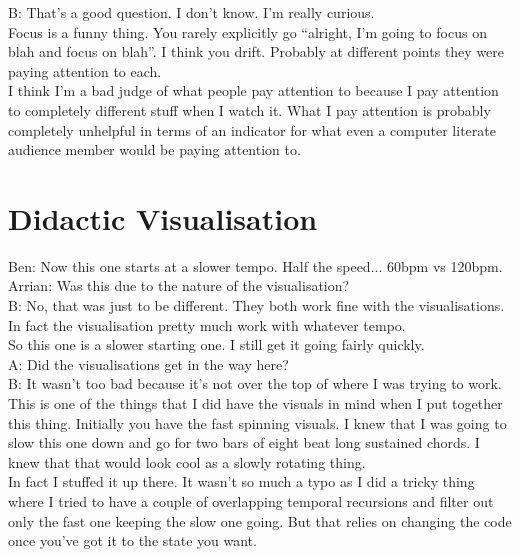 B: That's a good question. I don't know. I'm really curious.\\

Focus is a funny thing. You rarely explicitly go ``alright, I'm going to focus on blah and focus on blah''. I think you drift. Probably at different points they were paying attention to each.\\

I think I'm a bad judge of what people pay attention to because I pay attention to completely different stuff when I watch it. What I pay attention is probably completely unhelpful in terms of an indicator for what even a computer literate audience member would be paying attention to.\\

\section*{Didactic Visualisation}

Ben: Now this one starts at a slower tempo. Half the speed... 60bpm vs 120bpm.\\

Arrian: Was this due to the nature of the visualisation?\\

B: No, that was just to be different. They both work fine with the visualisations. In fact the visualisation pretty much work with whatever tempo.\\

So this one is a slower starting one. I still get it going fairly quickly.\\

A: Did the visualisations get in the way here?\\

B: It wasn't too bad because it's not over the top of where I was trying to work.\\

This is one of the things that I did have the visuals in mind when I put together this thing. Initially you have the fast spinning visuals. I knew that I was going to slow this one down and go for two bars of eight beat long sustained chords. I knew that that would look cool as a slowly rotating thing.\\

In fact I stuffed it up there. It wasn't so much a typo as I did a tricky thing where I tried to have a couple of overlapping temporal recursions and filter out only the fast one keeping the slow one going. But that relies on changing the code once you've got it to the state you want.\\

